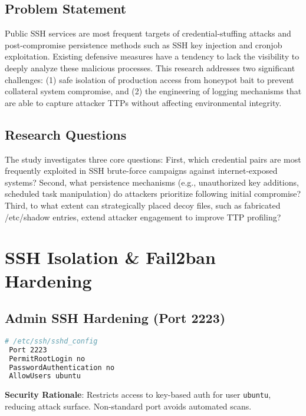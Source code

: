 \documentclass{cls/ULBreport}
\begin{document}
        \subsection{Problem Statement} 
        Public SSH services are most frequent targets of credential-stuffing attacks and post-compromise persistence methods such as SSH key injection and cronjob exploitation. Existing defensive measures have a tendency to lack the visibility to deeply analyze these malicious processes. This research addresses two significant challenges: (1) safe isolation of production access from honeypot bait to prevent collateral system compromise, and (2) the engineering of logging mechanisms that are able to capture attacker TTPs without affecting environmental integrity.

        \subsection{Research Questions}
        The study investigates three core questions: First, which credential pairs are most frequently exploited in SSH brute-force campaigns against internet-exposed systems? Second, what persistence mechanisms (e.g., unauthorized key additions, scheduled task manipulation) do attackers prioritize following initial compromise? Third, to what extent can strategically placed decoy files, such as fabricated /etc/shadow entries, extend attacker engagement to improve TTP profiling?

        
    \section{SSH Isolation \& Fail2ban Hardening}

        
        \subsection{Admin SSH Hardening (Port 2223)}
        \begin{lstlisting}[language=bash,caption={Securing Legitimate Access}]
 # /etc/ssh/sshd_config
 Port 2223
 PermitRootLogin no
 PasswordAuthentication no
 AllowUsers ubuntu
        \end{lstlisting}
        
        \textbf{Security Rationale}: Restricts access to key-based auth for user \texttt{ubuntu}, reducing attack surface. Non-standard port avoids automated scans.
        
\end{document}
